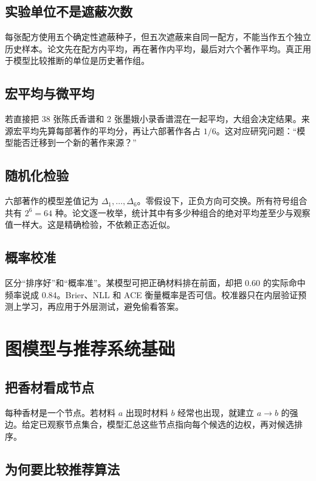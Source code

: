 \documentclass[UTF8,11pt,openany,fontset=none]{ctexbook}
\begin{document}
\section{实验单位不是遮蔽次数}

每张配方使用五个确定性遮蔽种子，但五次遮蔽来自同一配方，不能当作五个独立历史样本。论文先在配方内平均，再在著作内平均，最后对六个著作平均。真正用于模型比较推断的单位是历史著作组。

\section{宏平均与微平均}

若直接把 38 张陈氏香谱和 2 张墨娥小录香谱混在一起平均，大组会决定结果。来源宏平均先算每部著作的平均分，再让六部著作各占 $1/6$。这对应研究问题：“模型能否迁移到一个新的著作来源？”

\section{随机化检验}

六部著作的模型差值记为 $\Delta_1,\ldots,\Delta_6$。零假设下，正负方向可交换。所有符号组合共有 $2^6=64$ 种。论文逐一枚举，统计其中有多少种组合的绝对平均差至少与观察值一样大。这是精确检验，不依赖正态近似。

\section{概率校准}

区分“排序好”和“概率准”。某模型可把正确材料排在前面，却把 0.60 的实际命中频率说成 0.84。Brier、NLL 和 ACE 衡量概率是否可信。校准器只在内层验证预测上学习，再应用于外层测试，避免偷看答案。

\chapter{图模型与推荐系统基础}

\section{把香材看成节点}

每种香材是一个节点。若材料 $a$ 出现时材料 $b$ 经常也出现，就建立 $a\rightarrow b$ 的强边。给定已观察节点集合，模型汇总这些节点指向每个候选的边权，再对候选排序。

\section{为何要比较推荐算法}
\end{document}
